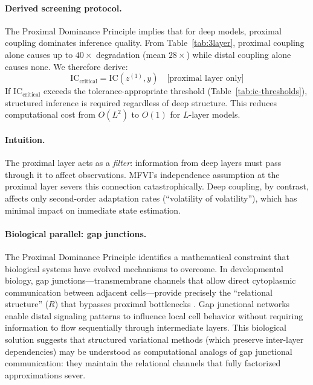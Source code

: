 \documentclass[10pt]{article} %
\theoremstyle{plain}
\theoremstyle{definition}
\newcommand{\IC}{\mathrm{IC}}  %
\begin{document}
\paragraph{Derived screening protocol.} The Proximal Dominance Principle implies that for deep models, proximal coupling dominates inference quality. From Table~\ref{tab:3layer}, proximal coupling alone causes up to $40\times$ degradation (mean $28\times$) while distal coupling alone causes none. We therefore derive:
\begin{equation}
\IC_{\text{critical}} = \IC(z^{(1)}, y) \quad \text{[proximal layer only]}
\end{equation}
If $\IC_{\text{critical}}$ exceeds the tolerance-appropriate threshold (Table~\ref{tab:ic-thresholds}), structured inference is required regardless of deep structure. This reduces computational cost from $O(L^2)$ to $O(1)$ for $L$-layer models.

\paragraph{Intuition.} The proximal layer acts as a \emph{filter}: information from deep layers must pass through it to affect observations. MFVI's independence assumption at the proximal layer severs this connection catastrophically. Deep coupling, by contrast, affects only second-order adaptation rates (``volatility of volatility''), which has minimal impact on immediate state estimation.

\paragraph{Biological parallel: gap junctions.} The Proximal Dominance Principle identifies a mathematical constraint that biological systems have evolved mechanisms to overcome. In developmental biology, gap junctions---transmembrane channels that allow direct cytoplasmic communication between adjacent cells---provide precisely the ``relational structure'' ($R$) that bypasses proximal bottlenecks \citep{levin2007gap}. Gap junctional networks enable distal signaling patterns to influence local cell behavior without requiring information to flow sequentially through intermediate layers. This biological solution suggests that structured variational methods (which preserve inter-layer dependencies) may be understood as computational analogs of gap junctional communication: they maintain the relational channels that fully factorized approximations sever.
\end{document}

